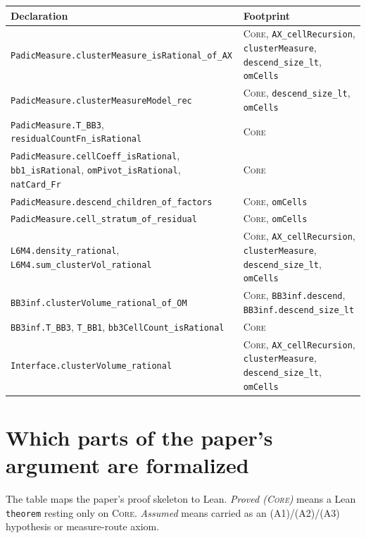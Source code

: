 \documentclass[11pt]{article}
\newcommand{\code}[1]{\texttt{#1}}
\newcommand{\Core}{\textsc{Core}}
\begin{document}
\begin{longtable}{@{}p{}p{}@{}}
\toprule
\textbf{Declaration} & \textbf{Footprint} \\
\midrule
\endhead
\code{PadicMeasure.clusterMeasure\_isRational\_of\_AX} & \Core, \code{AX\_cellRecursion},
\code{clusterMeasure}, \code{descend\_size\_lt}, \code{omCells} \\
\code{PadicMeasure.clusterMeasureModel\_rec} & \Core, \code{descend\_size\_lt},
\code{omCells} \\
\code{PadicMeasure.T\_BB3}, \code{residualCountFn\_isRational} & \Core \\
\code{PadicMeasure.cellCoeff\_isRational}, \code{bb1\_isRational},
\code{omPivot\_isRational}, \code{natCard\_Fr} & \Core \\
\code{PadicMeasure.descend\_children\_of\_factors} & \Core, \code{omCells} \\
\code{PadicMeasure.cell\_stratum\_of\_residual} & \Core, \code{omCells} \\
\code{L6M4.density\_rational}, \code{L6M4.sum\_clusterVol\_rational} & \Core,
\code{AX\_cellRecursion}, \code{clusterMeasure}, \code{descend\_size\_lt}, \code{omCells} \\
\code{BB3inf.clusterVolume\_rational\_of\_OM} & \Core, \code{BB3inf.descend},
\code{BB3inf.descend\_size\_lt} \\
\code{BB3inf.T\_BB3}, \code{T\_BB1}, \code{bb3CellCount\_isRational} & \Core \\
\code{Interface.clusterVolume\_rational} & \Core, \code{AX\_cellRecursion},
\code{clusterMeasure}, \code{descend\_size\_lt}, \code{omCells} \\
\bottomrule
\end{longtable}

\section{Which parts of the paper's argument are formalized}\label{sec:map}

The table maps the paper's proof skeleton to Lean. \emph{Proved (\Core)} means a Lean
\code{theorem} resting only on \Core. \emph{Assumed} means carried as an (A1)/(A2)/(A3)
hypothesis or measure-route axiom.
\end{document}
